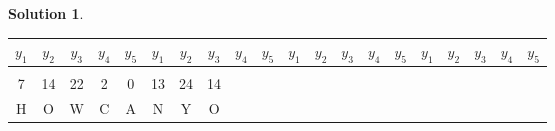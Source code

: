 \documentclass[11pt]{article}
\theoremstyle{definition}\newtheorem{definition}{Definition}
\theoremstyle{definition}\newtheorem{question}{Question}
\theoremstyle{definition}\newtheorem*{solution}{Solution}
\begin{document}
\begin{solution}
\begin{table}[h]
{\begin{tabular}{|cccccccccccccccccccc|}
        $y_1$ & $y_2$ & $y_3$ & $y_4$                      & \multicolumn{1}{c|}{$y_5$} & $y_1$ & $y_2$ & $y_3$                      & $y_4$ & \multicolumn{1}{c|}{$y_5$} & $y_1$ & $y_2$                      & $y_3$ & $y_4$ & \multicolumn{1}{c|}{$y_5$} & $y_1$                      & $y_2$ & $y_3$ & $y_4$ & $y_5$ \\ \hline
              &       &       &                            & \multicolumn{1}{c|}{}      &       &       &                            &       & \multicolumn{1}{c|}{}      &       &                            &       &       & \multicolumn{1}{c|}{}      &                            &       &       &       &       \\ \hline
        7     & 14    & 22    & 2                          & \multicolumn{1}{c|}{0}     & 13    & 24    & \multicolumn{1}{c|}{14}    &       &                            &       &                            &       &       &                            &                            &       &       &       &       \\ \cline{1-8}
        H     & O     & W     & C                          & \multicolumn{1}{c|}{A}     & N     & Y     & \multicolumn{1}{c|}{O}     &       &                            &       &                            &       &       &                            &                            &       &       &       &       \\ \hline
        \end{tabular}%
        }
    \end{table}
    

\end{solution}
\end{document}
